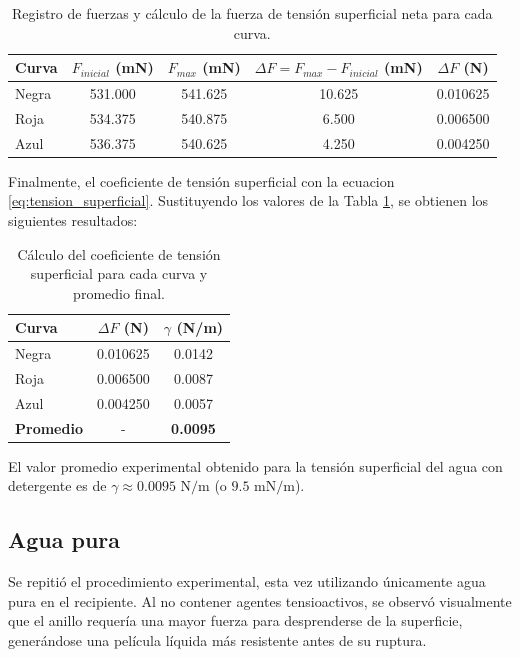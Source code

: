 \documentclass[11pt,a4paper]{article}
\begin{document}
\begin{table}[H]
    \centering
    \caption{Registro de fuerzas y cálculo de la fuerza de tensión superficial neta para cada curva.}
    \label{tab:datos_fuerzas}
    \begin{tabular}{@{}lcccc@{}}
        \toprule
        \textbf{Curva} & \textbf{\(F_{inicial}\) (mN)} & \textbf{\(F_{max}\) (mN)} & \textbf{\(\Delta F = F_{max} - F_{inicial}\) (mN)} & \textbf{\(\Delta F\) (N)} \\ \midrule
        Negra & 531.000 & 541.625 & 10.625 & 0.010625 \\
        Roja  & 534.375 & 540.875 & 6.500  & 0.006500 \\
        Azul  & 536.375 & 540.625 & 4.250  & 0.004250 \\ \bottomrule
    \end{tabular}
\end{table}

Finalmente, el coeficiente de tensión superficial con la ecuacion \eqref{eq:tension_superficial}.
Sustituyendo los valores de la Tabla \ref{tab:datos_fuerzas}, se obtienen los siguientes resultados:

\begin{table}[H]
    \centering
    \label{tab:resultados_gamma}
    \begin{tabular}{@{}lcc@{}}
        \toprule
        \textbf{Curva} & \textbf{\(\Delta F\) (N)} & \textbf{\(\gamma\) (N/m)} \\ \midrule
        Negra & 0.010625 & 0.0142 \\
        Roja  & 0.006500 & 0.0087 \\
        Azul  & 0.004250 & 0.0057 \\ \midrule
        \textbf{Promedio} & - & \textbf{0.0095} \\ \bottomrule
    \end{tabular}
        \caption{Cálculo del coeficiente de tensión superficial para cada curva y promedio final.}

\end{table}

El valor promedio experimental obtenido para la tensión superficial del agua con detergente es de \(\gamma \approx 0.0095 \text{ N/m}\) (o \(9.5 \text{ mN/m}\)). 

\subsection{Agua pura}

Se repitió el procedimiento experimental, esta vez utilizando únicamente agua pura en el recipiente. Al no contener agentes tensioactivos, se observó visualmente que el anillo requería una mayor fuerza para desprenderse de la superficie, generándose una película líquida más resistente antes de su ruptura.
\end{document}
